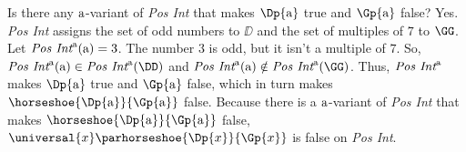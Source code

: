 \begin{PROOF}
Is there any $\mathrm{a}$-variant of \emph{Pos Int} that makes $\Dp{\constant{a}}$ true and $\Gp{\constant{a}}$ false?  Yes.  \emph{Pos Int} assigns the set of odd numbers to $\DD$ and the set of multiples of $7$ to $\GG$.  Let $\emph{Pos Int}^{\mathrm{a}}(\mathrm{a})=3$.  The number $3$ is odd, but it isn't a multiple of $7$.  So, $\emph{Pos Int}^{\constant{a}}(\constant{a})\in\emph{Pos Int}^{\constant{a}}(\DD)$ and $\emph{Pos Int}^{\constant{a}}(\constant{a})\notin\emph{Pos Int}^{\constant{a}}(\GG)$.  Thus, $\emph{Pos Int}^{\mathrm{a}}$ makes $\Dp{\constant{a}}$ true and $\Gp{\constant{a}}$ false, which in turn makes $\horseshoe{\Dp{\constant{a}}}{\Gp{\constant{a}}}$ false.  Because there is a $\mathrm{a}$-variant of \emph{Pos Int} that makes $\horseshoe{\Dp{\constant{a}}}{\Gp{\constant{a}}}$ false, $\universal{\variable{x}}\parhorseshoe{\Dp{\variable{x}}}{\Gp{\variable{x}}}$ is false on \emph{Pos Int}.
\end{PROOF}


